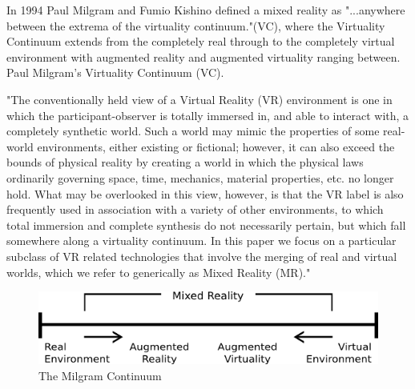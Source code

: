 In 1994 Paul Milgram and Fumio Kishino defined a mixed reality as "...anywhere between the extrema of the virtuality continuum."(VC), where the Virtuality Continuum extends from the completely real through to the completely virtual environment with augmented reality and augmented virtuality ranging between.
Paul Milgram's Virtuality Continuum (VC).

"The conventionally held view of a Virtual Reality (VR) environment is one in which the participant-observer is totally immersed in, and able to interact with, a completely synthetic world. Such a world may mimic the properties of some real-world environments, either existing or fictional; however, it can also exceed the bounds of physical reality by creating a world in which the physical laws ordinarily governing space, time, mechanics, material properties, etc. no longer hold. What may be overlooked in this view, however, is that the VR label is also frequently used in association with a variety of other environments, to which total immersion and complete synthesis do not necessarily pertain, but which fall somewhere along a virtuality continuum. In this paper we focus on a particular subclass of VR related technologies that involve the merging of real and virtual worlds, which we refer to generically as Mixed Reality (MR)."

\begin{figure}
\centering
\includegraphics[bb=0 0 546 117,scale=0.8]{Millee.png}
\caption{The Milgram Continuum}
\end{figure}

